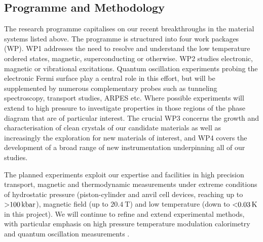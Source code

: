 





\subsection*{Programme and Methodology}
\noindent
The research programme capitalises on our recent breakthroughs in the material systems listed above. %
The programme is structured into four work packages (WP). WP1 addresses the need to resolve and understand the low temperature ordered states, magnetic, superconducting or otherwise. WP2 studies electronic, magnetic or vibrational excitations. Quantum oscillation experiments probing the electronic Fermi surface play a central role in this effort, but will be supplemented by numerous complementary probes such as tunneling spectroscopy, transport studies, ARPES etc. Where possible experiments will extend to high pressure to investigate properties in those regions of the phase diagram that are of particular interest. The crucial WP3 concerns the growth and characterisation of clean crystals of our candidate materials as well as increasingly the exploration for new materials of interest, and WP4 covers the development of a broad range of new instrumentation underpinning all of our studies. 

The planned experiments exploit our expertise and facilities in high precision transport, magnetic and thermodynamic measurements under extreme conditions of hydrostatic pressure (piston-cylinder and anvil cell devices, reaching up to $\SI{>100}{\kilo\bar}$), magnetic field (up to $\SI{20.4}{\tesla}$) and low temperature (down to $\SI{<0.03}{\kelvin}$ in this project). We will continue to refine and extend experimental methods, with particular emphasis on high pressure temperature modulation calorimetry and quantum oscillation measurements  . %


